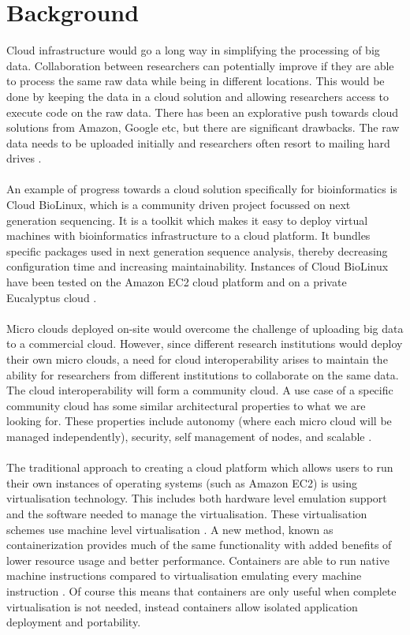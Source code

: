 \documentclass{sig-alternate-05-2015}
\begin{document}
\section{Background}
Cloud infrastructure would go a long way in simplifying the processing of big data. Collaboration between researchers can potentially improve if they are able to process the same raw data while being in different locations. This would be done by keeping the data in a cloud solution and allowing researchers access to execute code on the raw data. There has been an explorative push towards cloud solutions from Amazon, Google etc, but there are significant drawbacks. The raw data needs to be uploaded initially and researchers often resort to mailing hard drives \cite{baker2010next}. 
\\
\\
An example of progress towards a cloud solution specifically for bioinformatics is Cloud BioLinux, which is a community driven project focussed on next generation sequencing. It is a toolkit which makes it easy to deploy virtual machines with bioinformatics infrastructure to a cloud platform. It bundles specific packages used in next generation sequence analysis, thereby decreasing configuration time and increasing maintainability. Instances of Cloud BioLinux have been tested on the Amazon EC2 cloud platform and on a private Eucalyptus cloud \cite{krampis2012cloud}.
\\
\\
Micro clouds deployed on-site would overcome the challenge of uploading big data to a commercial cloud. However, since different research institutions would deploy their own micro clouds, a need for cloud interoperability arises to maintain the ability for researchers from different institutions to collaborate on the same data. The cloud interoperability will form a community cloud. A use case of a specific community cloud has some similar architectural properties to what we are looking for. These properties include autonomy (where each micro cloud will be managed independently), security, self management of nodes, and scalable \cite{jimenez2014deploying}.
\\
\\
The traditional approach to creating a cloud platform which allows users to run their own instances of operating systems (such as Amazon EC2) is using virtualisation technology. This includes both hardware level emulation support and the software needed to manage the virtualisation. These virtualisation schemes use machine level virtualisation \cite{fink2014docker}. A new method, known as containerization provides much of the same functionality with added benefits of lower resource usage and better performance. Containers are able to run native machine instructions compared to virtualisation emulating every machine instruction \cite{dua2014virtualization}. Of course this means that containers are only useful when complete virtualisation is not needed, instead containers allow isolated application deployment and portability.
\end{document}
